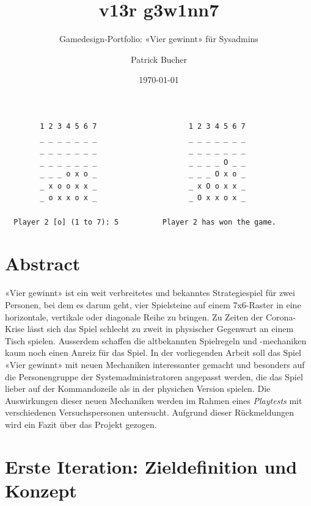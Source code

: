 \documentclass[a4paper,11pt,hidelinks]{scrartcl}
\begin{document}
\author{Patrick Bucher}
\title{v13r g3w1nn7}
\subtitle{Gamedesign-Portfolio: «Vier gewinnt» für Sysadmins}
\date{\today}
\maketitle
\thispagestyle{empty}

\begin{center}
    \begin{lstlisting}
        1 2 3 4 5 6 7                     1 2 3 4 5 6 7
        _ _ _ _ _ _ _                     _ _ _ _ _ _ _
        _ _ _ _ _ _ _                     _ _ _ _ _ _ _
        _ _ _ _ _ _ _                     _ _ _ _ O _ _
        _ _ _ o x o _                     _ _ _ O x o _
        _ x o o x x _                     _ x O o x x _
        _ o x x o x _                     _ O x x o x _

  Player 2 [o] (1 to 7): 5          Player 2 has won the game.
    \end{lstlisting}
\end{center}

\section*{Abstract}

«Vier gewinnt» ist ein weit verbreitetes und bekanntes Strategiespiel für zwei Personen, bei dem es darum geht, vier Spielsteine auf einem 7x6-Raster in eine horizontale, vertikale oder diagonale Reihe zu bringen. Zu Zeiten der Corona-Krise lässt sich das Spiel schlecht zu zweit in physischer Gegenwart an einem Tisch spielen. Ausserdem schaffen die altbekannten Spielregeln und -mechaniken kaum noch einen Anreiz für das Spiel. In der vorliegenden Arbeit soll das Spiel «Vier gewinnt» mit neuen Mechaniken interessanter gemacht und besonders auf die Personengruppe der Systemadministratoren angepasst werden, die das Spiel lieber auf der Kommandozeile als in der physichen Version spielen. Die Auswirkungen dieser neuen Mechaniken werden im Rahmen eines \textit{Playtests} mit verschiedenen Versuchspersonen untersucht. Aufgrund dieser Rückmeldungen wird ein Fazit über das Projekt gezogen.
 
\newpage

\tableofcontents
\newpage

\section{Erste Iteration: Zieldefinition und Konzept}
\end{document}
